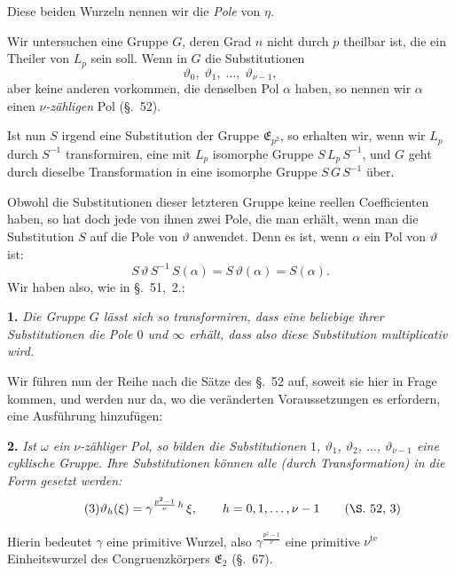 \documentclass[12pt,a4paper]{article}
\begin{document}
Diese beiden Wurzeln nennen wir die \emph{Pole} von $\eta$.

Wir untersuchen eine Gruppe $G$, deren Grad $n$ nicht durch $p$ theilbar ist, die ein Theiler von $L_{p}$ sein soll. Wenn in $G$ die Substitutionen
\[
\vartheta_{0},\; \vartheta_{1},\; \ldots,\; \vartheta_{\nu-1},
\]
aber keine anderen vorkommen, die denselben Pol $\alpha$ haben, so nennen wir $\alpha$ einen $\nu$\emph{-zähligen} Pol (\S.~52).

Ist nun $S$ irgend eine Substitution der Gruppe $\mathfrak{E}_{p^{2}}$, so erhalten wir, wenn wir $L_{p}$ durch $S^{-1}$ transformiren, eine mit $L_{p}$ isomorphe Gruppe $S\,L_{p}\,S^{-1}$, und $G$ geht durch dieselbe Transformation in eine isomorphe Gruppe $S\,G\,S^{-1}$ über.

Obwohl die Substitutionen dieser letzteren Gruppe keine reellen Coefficienten haben, so hat doch jede von ihnen zwei Pole, die man erhält, wenn man die Substitution $S$ auf die Pole von $\vartheta$ anwendet. Denn es ist, wenn $\alpha$ ein Pol von $\vartheta$ ist:
\[
S\,\vartheta\,S^{-1}\,S(\alpha) = S\,\vartheta(\alpha) = S(\alpha).
\]
Wir haben also, wie in \S.~51,~2.:

\medskip\noindent
\textbf{1.} \emph{Die Gruppe $G$ lässt sich so transformiren, dass eine beliebige ihrer Substitutionen die Pole $0$ und $\infty$ erhält, dass also diese Substitution multiplicativ wird.}

\newpage
{}

Wir führen nun der Reihe nach die Sätze des \S.~52 auf, soweit sie hier in Frage kommen, und werden nur da, wo die veränderten Voraussetzungen es erfordern, eine Ausführung hinzufügen:

\medskip\noindent
\textbf{2.} \emph{Ist $\omega$ ein $\nu$-zähliger Pol, so bilden die Substitutionen $1$, $\vartheta_{1}$, $\vartheta_{2}$, $\ldots$, $\vartheta_{\nu-1}$ eine cyklische Gruppe. Ihre Substitutionen können alle (durch Transformation) in die Form gesetzt werden:}
\begin{equation}\label{eq:71.3}
\tag{3}
\vartheta_{h}(\xi) = \gamma^{\frac{p^{2}-1}{\nu}\,h}\,\xi,\qquad
h = 0, 1, \ldots, \nu - 1\qquad\text{(\S.~52,~3)}
\end{equation}

Hierin bedeutet $\gamma$ eine primitive Wurzel, also $\gamma^{\frac{p^{2}-1}{\nu}}$ eine primitive $\nu^{\text{te}}$ Einheitswurzel des Congruenzkörpers $\mathfrak{E}_{2}$ (\S.~67).
\end{document}

